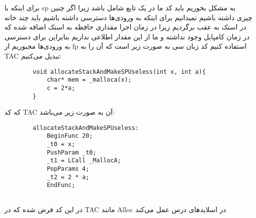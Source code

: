 
برای اینکه با sp به مشکل بخوریم باید کد ما در یک تابع شامل  باشد زیرا اگر چنین چیزی داشته باشیم نمیدانیم برای اینکه به ورودی‌ها دسترسی داشته باشیم باید چند خانه در استک به عقب برگردیم زیرا در زمان اجرا مقداری حافظه به استک اضافه شده که در زمان کامپایل وجود نداشته و ما از این مقدار اطلاعی نداریم بنابراین برای دسترسی به ورودی‌ها مجبوریم از fp استفاده کنیم کد زبان سی به صورت زیر است که آن را به TAC تبدیل می‌کنیم:
\begin{latin}
	\begin{verbatim}
		void allocateStackAndMakeSPUseless(int x, int a){
		    char* mem = _malloca(x);
		    c = 2*a;
		}
	\end{verbatim}
\end{latin}
که کد TAC آن به صورت زیر می‌باشد:
\begin{latin}
	\begin{verbatim}
		allocateStackAndMakeSPUseless:
		    BeginFunc 20;
		    _t0 = x;
		    PushParam _t0;
		    _t1 = LCall _MallocA;
		    PopParams 4;
		    _t2 = 2 * a;
		    EndFunc;
			
	\end{verbatim}
\end{latin}
در این کد فرض شده که  در TAC مانند Alloc در اسلاید‌های درس عمل می‌کند